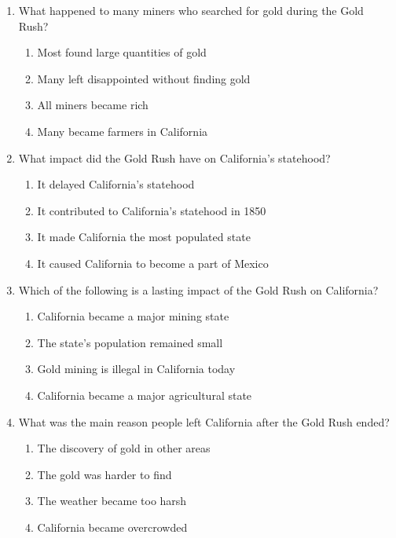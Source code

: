 \documentclass[12pt]{article}
\begin{document}
\begin{enumerate}
    \vspace{0.5cm}

    \item What happened to many miners who searched for gold during the Gold Rush?
    \begin{enumerate}[label=\Alph*.]
        \item Most found large quantities of gold
        \item Many left disappointed without finding gold
        \item All miners became rich
        \item Many became farmers in California
    \end{enumerate}

    \vspace{0.5cm}

    \item What impact did the Gold Rush have on California's statehood?
    \begin{enumerate}[label=\Alph*.]
        \item It delayed California's statehood
        \item It contributed to California's statehood in 1850
        \item It made California the most populated state
        \item It caused California to become a part of Mexico
    \end{enumerate}

    \vspace{0.5cm}

    \item Which of the following is a lasting impact of the Gold Rush on California?
    \begin{enumerate}[label=\Alph*.]
        \item California became a major mining state
        \item The state’s population remained small
        \item Gold mining is illegal in California today
        \item California became a major agricultural state
    \end{enumerate}

    \vspace{0.5cm}

    \item What was the main reason people left California after the Gold Rush ended?
    \begin{enumerate}[label=\Alph*.]
        \item The discovery of gold in other areas
        \item The gold was harder to find
        \item The weather became too harsh
        \item California became overcrowded
    \end{enumerate}


\end{enumerate}
\end{document}
